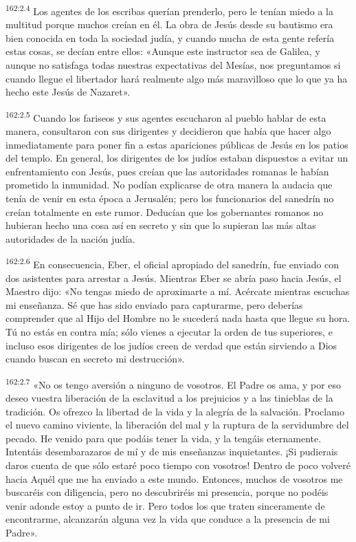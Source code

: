 \par 
\textsuperscript{162:2.4} Los agentes de los escribas querían prenderlo, pero le tenían miedo a la multitud porque muchos creían en él. La obra de Jesús desde su bautismo era bien conocida en toda la sociedad judía, y cuando mucha de esta gente refería estas cosas, se decían entre ellos: «Aunque este instructor sea de Galilea, y aunque no satisfaga todas nuestras expectativas del Mesías, nos preguntamos si cuando llegue el libertador hará realmente algo más maravilloso que lo que ya ha hecho este Jesús de Nazaret».

\par 
\textsuperscript{162:2.5} Cuando los fariseos y sus agentes escucharon al pueblo hablar de esta manera, consultaron con sus dirigentes y decidieron que había que hacer algo inmediatamente para poner fin a estas apariciones públicas de Jesús en los patios del templo. En general, los dirigentes de los judíos estaban dispuestos a evitar un enfrentamiento con Jesús, pues creían que las autoridades romanas le habían prometido la inmunidad. No podían explicarse de otra manera la audacia que tenía de venir en esta época a Jerusalén; pero los funcionarios del sanedrín no creían totalmente en este rumor. Deducían que los gobernantes romanos no hubieran hecho una cosa así en secreto y sin que lo supieran las más altas autoridades de la nación judía.

\par 
\textsuperscript{162:2.6} En consecuencia, Eber, el oficial apropiado del sanedrín, fue enviado con dos asistentes para arrestar a Jesús. Mientras Eber se abría paso hacia Jesús, el Maestro dijo: «No tengas miedo de aproximarte a mí. Acércate mientras escuchas mi enseñanza. Sé que has sido enviado para capturarme, pero deberías comprender que al Hijo del Hombre no le sucederá nada hasta que llegue su hora. Tú no estás en contra mía; sólo vienes a ejecutar la orden de tus superiores, e incluso esos dirigentes de los judíos creen de verdad que están sirviendo a Dios cuando buscan en secreto mi destrucción».

\par 
\textsuperscript{162:2.7} «No os tengo aversión a ninguno de vosotros. El Padre os ama, y por eso deseo vuestra liberación de la esclavitud a los prejuicios y a las tinieblas de la tradición. Os ofrezco la libertad de la vida y la alegría de la salvación. Proclamo el nuevo camino viviente, la liberación del mal y la ruptura de la servidumbre del pecado. He venido para que podáis tener la vida, y la tengáis eternamente. Intentáis desembarazaros de mí y de mis enseñanzas inquietantes. ¡Si pudierais daros cuenta de que sólo estaré poco tiempo con vosotros! Dentro de poco volveré hacia Aquél que me ha enviado a este mundo. Entonces, muchos de vosotros me buscaréis con diligencia, pero no descubriréis mi presencia, porque no podéis venir adonde estoy a punto de ir. Pero todos los que traten sinceramente de encontrarme, alcanzarán alguna vez la vida que conduce a la presencia de mi Padre».

